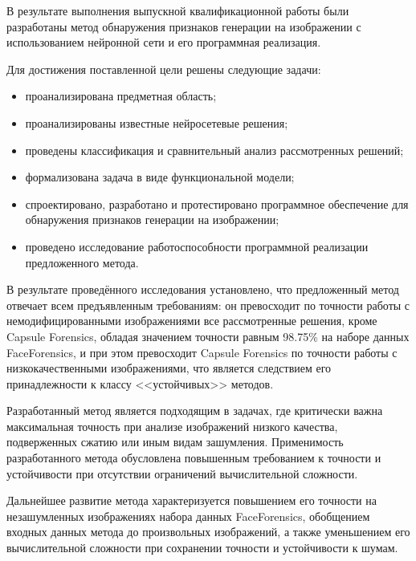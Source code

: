 
В результате выполнения выпускной квалификационной работы были разработаны метод обнаружения признаков генерации на изображении с использованием нейронной сети и его программная реализация.

Для достижения поставленной цели решены следующие задачи:
\begin{itemize}
	\item проанализирована предметная область;
	\item проанализированы известные нейросетевые решения;
	\item проведены классификация и сравнительный анализ рассмотренных решений;
	\item формализована задача в виде функциональной модели;
	\item спроектировано, разработано и протестировано программное обеспечение для обнаружения признаков генерации на изображении;
	\item проведено исследование работоспособности программной реализации предложенного метода.
\end{itemize}

В результате проведённого исследования установлено, что предложенный метод отвечает всем предъявленным требованиям: он превосходит по точности работы с немодифицированными изображениями все рассмотренные решения, кроме Capsule Forensics, обладая значением точности равным 98.75\% на наборе данных FaceForensics, и при этом превосходит Capsule Forensics по точности работы с низкокачественными изображениями, что является следствием его принадлежности к классу <<устойчивых>> методов.

Разработанный метод является подходящим в задачах, где критически важна максимальная точность при анализе изображений низкого качества, подверженных сжатию или иным видам зашумления. Применимость разработанного метода обусловлена повышенным требованием к точности и устойчивости при отсутствии ограничений вычислительной сложности. 

Дальнейшее развитие метода характеризуется повышением его точности на незашумленных изображениях набора данных FaceForensics, обобщением входных данных метода до произвольных изображений, а также уменьшением его вычислительной сложности при сохранении точности и устойчивости к шумам.
